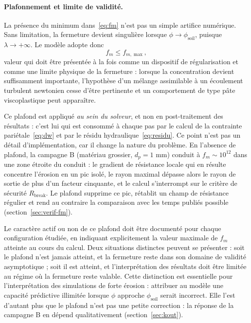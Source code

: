 \documentclass[11pt,a4paper]{report}
\newcommand{\phisol}{\phi_{\mathrm{soil}}}
\begin{document}
\paragraph{Plafonnement et limite de validité.}
\label{par:fm-plafond}
La présence du minimum dans~\eqref{eq:fm} n'est pas un simple artifice numérique. Sans limitation, la
fermeture devient singulière lorsque \(\phi \to \phisol\), puisque \(\lambda \to +\infty\). Le modèle adopte
donc
\begin{equation}
f_m \le f_{m,\max},
\label{eq:fmmax}
\end{equation}
valeur qui doit être présentée à la fois comme un dispositif de régularisation et comme une limite
physique de la fermeture : lorsque la concentration devient suffisamment importante, l'hypothèse d'un
mélange assimilable à un écoulement turbulent newtonien cesse d'être pertinente et un comportement de type
pâte viscoplastique peut apparaître.

Ce plafond est appliqué \emph{au sein du solveur}, et non en post-traitement des résultats : c'est lui qui
est consommé à chaque pas par le calcul de la contrainte pariétale~\eqref{eq:dw} et par le résidu
hydraulique~\eqref{eq:residu}. Ce point n'est pas un détail d'implémentation, car il change la nature du
problème. En l'absence de plafond, la campagne B (matériau grossier, \(d_p = 1\) mm) conduit à
\(f_m \sim 10^{12}\) dans une zone étroite du conduit : le gradient de résistance locale qui en résulte
concentre l'érosion en un pic isolé, le rayon maximal dépasse alors le rayon de sortie de plus d'un facteur
cinquante, et le calcul s'interrompt sur le critère de sécurité \(R_{\mathrm{break}}\). Le plafond supprime
ce pic, rétablit un champ de résistance régulier et rend au contraire la comparaison avec les temps publiés
possible (section~\ref{sec:verif-fm}).

Le caractère actif ou non de ce plafond doit être documenté pour chaque configuration étudiée, en
indiquant explicitement la valeur maximale de \(f_m\) atteinte au cours du calcul. Deux situations
distinctes peuvent se présenter : soit le plafond n'est jamais atteint, et la fermeture reste dans son
domaine de validité asymptotique ; soit il est atteint, et l'interprétation des résultats doit être
limitée au régime où la fermeture reste valable. Cette distinction est essentielle pour l'interprétation
des simulations de forte érosion : attribuer au modèle une capacité prédictive illimitée lorsque \(\phi\)
approche \(\phisol\) serait incorrect. Elle l'est d'autant plus que le plafond n'est pas une petite
correction : la réponse de la campagne B en dépend qualitativement (section~\ref{sec:kout}).
\end{document}
